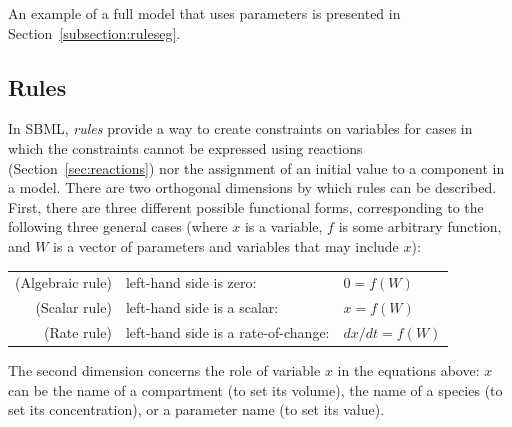 \documentclass[10pt]{cekarticle}
\newcommand{\changed}[1]{\textcolor{BrickRed}{#1}}
\newenvironment{blockChanged}{\color{BrickRed}}{}
\begin{document}
An example of a full model that uses parameters is presented in
Section~\ref{subsection:ruleseg}.


\subsection{Rules}
\label{sec:rules}

In SBML, \emph{rules} provide a way to create constraints on variables for
cases in which the constraints cannot be expressed using \changed{reactions
  (Section~\ref{sec:reactions}) nor the assignment of an initial value to a
  component in a model}.  There are two orthogonal dimensions by which
rules can be described.  First, there are three different possible
functional forms, corresponding to the following three general cases
\changed{(where $x$ is a variable, $f$ is some arbitrary function, and $W$
  is a vector of parameters and variables that may include $x$):}

\begin{blockChanged}
\begin{center}
\begin{tabular}{rll}
(Algebraic rule) & left-hand side is zero:             & $0 = f(W)$\\
(Scalar rule) 	& left-hand side is a scalar:         & $x = f(W)$\\
(Rate rule) 	& left-hand side is a rate-of-change: & $dx/dt = f(W)$
\end{tabular}
\end{center}
\end{blockChanged}

The second dimension concerns the role of variable $x$ in the equations
above: $x$ can be the name of a compartment (to set its volume), the name
of a \changed{species} (to set its concentration), or a parameter name (to
set its value).  
\end{document}
